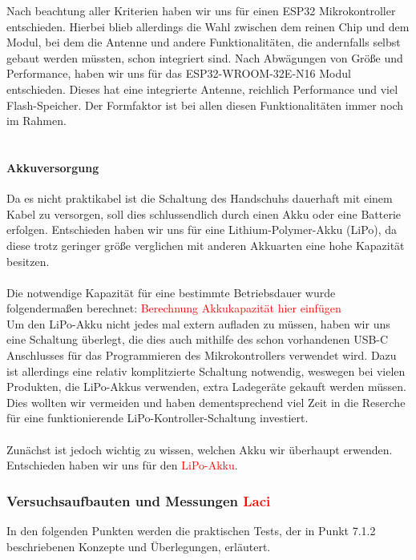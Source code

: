 \documentclass[titlepage,12pt,twoside]{article}
\begin{document}
Nach beachtung aller Kriterien haben wir uns für einen ESP32 Mikrokontroller entschieden. Hierbei blieb allerdings die Wahl zwischen
dem reinen Chip und dem Modul, bei dem die Antenne und andere Funktionalitäten, die andernfalls selbst gebaut werden müssten,
schon integriert sind. Nach Abwägungen von Größe und Performance, haben wir uns für das ESP32-WROOM-32E-N16 Modul entschieden.
Dieses hat eine integrierte Antenne, reichlich Performance und viel Flash-Speicher. Der Formfaktor ist bei allen diesen 
Funktionalitäten immer noch im Rahmen. \\
\\
\paragraph{Akkuversorgung}
\hfill \break
\hfill \break
Da es nicht praktikabel ist die Schaltung des Handschuhs dauerhaft mit einem Kabel zu versorgen, soll dies schlussendlich durch
einen Akku oder eine Batterie erfolgen. Entschieden haben wir uns für eine Lithium-Polymer-Akku (LiPo), da diese trotz geringer 
größe verglichen mit anderen Akkuarten eine hohe Kapazität besitzen. \\
\\
Die notwendige Kapazität für eine bestimmte Betriebsdauer wurde folgendermaßen berechnet:
\textcolor{red}{Berechnung Akkukapazität hier einfügen}
\\
Um den LiPo-Akku nicht jedes mal extern aufladen zu müssen, haben wir uns eine Schaltung überlegt, die dies auch mithilfe des
schon vorhandenen USB-C Anschlusses für das Programmieren des Mikrokontrollers verwendet wird. Dazu ist allerdings eine relativ 
komplitzierte Schaltung notwendig, weswegen bei vielen Produkten, die LiPo-Akkus verwenden, extra Ladegeräte gekauft werden müssen.
Dies wollten wir vermeiden und haben dementsprechend viel Zeit in die Reserche für eine funktionierende LiPo-Kontroller-Schaltung
investiert. \\
\\
Zunächst ist jedoch wichtig zu wissen, welchen Akku wir überhaupt erwenden. Entschieden haben wir uns für den \textcolor{red}{LiPo-Akku}.
\\

\subsubsection{Versuchsaufbauten und Messungen \textcolor{red}{Laci}}
In den folgenden Punkten werden die praktischen Tests, der in Punkt 7.1.2 beschriebenen Konzepte und Überlegungen, erläutert.\\
\end{document}
